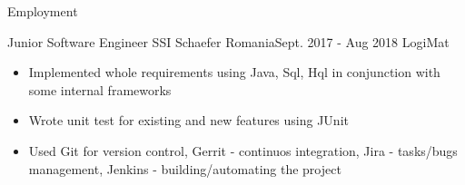 \documentclass[]{mcdowellcv}
\begin{document}
	\makeheader
	
	\begin{cvsection}{Employment}
		\begin{cvsubsection}{Junior Software Engineer }{SSI Schaefer Romania}{Sept. 2017 - Aug 2018}
			LogiMat
			\begin{itemize}
				\item Implemented whole requirements using Java, Sql, Hql in conjunction with some internal frameworks
				\item Wrote unit test for existing and new features using JUnit 
				\item Used Git for version control, Gerrit - continuos integration, Jira - tasks/bugs management, \linebreak 
						Jenkins - building/automating the project  
			\end{itemize}
		\end{cvsubsection}
		
	\end{cvsection}
	
\end{document}
